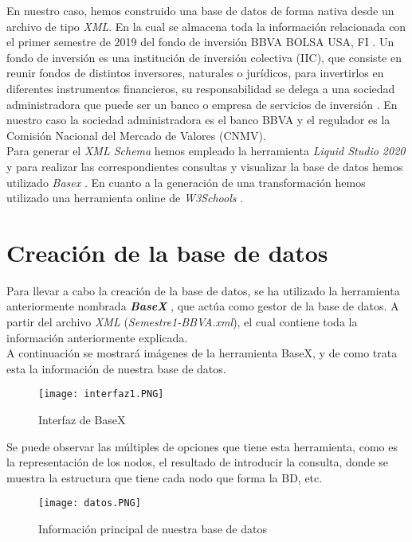 \documentclass[11pt]{diazessay} %
\begin{document}
En nuestro caso, hemos construido una base de datos de forma nativa desde un archivo de tipo \textit{XML}. En la cual se almacena toda la información relacionada con el primer semestre de 2019 del fondo de inversión BBVA BOLSA USA, FI \cite{fondo}. Un fondo de inversión es una institución de inversión colectiva (IIC), que consiste en reunir fondos de distintos inversores, naturales o jurídicos, para invertirlos en diferentes instrumentos financieros, su responsabilidad se delega a una sociedad administradora que puede ser un banco o empresa de servicios de inversión \cite{def_fondo}. En nuestro caso la sociedad administradora es el banco BBVA y el regulador es la Comisión Nacional del Mercado de Valores (CNMV).\\

Para generar el \textit{XML Schema} hemos empleado la herramienta \textit{Liquid Studio 2020} \cite{liquid_studio} y para realizar las correspondientes consultas y visualizar la base de datos hemos utilizado \textit{Basex} \cite{basex}. En cuanto a la generación de una transformación hemos utilizado una herramienta online de \textit{W3Schools} \cite{gen_xslt}.
\newpage

\section*{Creación de la base de datos}
Para llevar a cabo la creación de la base de datos, se ha utilizado la herramienta anteriormente nombrada \textit{\textbf{BaseX}} \cite{basex}, que actúa como gestor de la base de datos. A partir del archivo \textit{XML} (\textit{Semestre1-BBVA.xml}), el cual contiene toda la información anteriormente explicada.\\


A continuación se mostrará imágenes de la herramienta BaseX, y de como trata esta la información de nuestra base de datos.

\begin{figure}[h!]
	\texttt{[image: interfaz1.PNG]}
	\centering
	\caption{Interfaz de  BaseX}
	\label{fig:app}
\end{figure}

Se puede observar las múltiples de opciones que tiene esta herramienta, como es la representación de los nodos, el resultado de introducir la consulta, donde se muestra la estructura que tiene cada nodo que forma la BD, etc.

\begin{figure}[h!]
	\texttt{[image: datos.PNG]}
	\centering
	\caption{Información principal de nuestra base de datos}
	\label{fig:data-app}
\end{figure}
\end{document}
